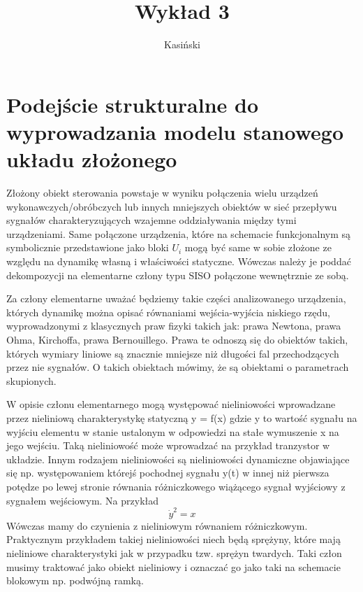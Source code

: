 \documentclass{article}
\author{Kasiński}
\title{Wykład 3}
\begin{document}
	\maketitle
	\section{Podejście strukturalne do wyprowadzania modelu stanowego układu złożonego}

		Złożony obiekt sterowania powstaje w wyniku połączenia wielu urządzeń
		wykonawczych/obróbczych lub
		innych mniejszych obiektów  w sieć przepływu sygnałów charakteryzujących wzajemne
		oddziaływania między tymi urządzeniami.
		Same połączone urządzenia, które na schemacie funkcjonalnym są
		symbolicznie przedstawione jako bloki $U_i$ mogą być same w sobie złożone ze względu na
		dynamikę własną i właściwości statyczne. Wówczas należy je poddać dekompozycji na
		elementarne człony typu SISO połączone wewnętrznie ze sobą.
		
		Za człony elementarne uważać będziemy takie części analizowanego urządzenia, których
		dynamikę można opisać równaniami wejścia-wyjścia niskiego rzędu,
		wyprowadzonymi z klasycznych praw fizyki takich jak: prawa Newtona, prawa Ohma,
		Kirchoffa, prawa Bernouillego. Prawa te odnoszą się do obiektów
		takich, których wymiary liniowe są znacznie mniejsze niż długości fal
		przechodzących przez nie sygnałów. O takich obiektach mówimy, że są obiektami
		o parametrach skupionych.

		W opisie członu elementarnego mogą występować nieliniowości wprowadzane przez
		nieliniową charakterystykę statyczną y = f(x) gdzie y to wartość sygnału na
		wyjściu elementu w stanie ustalonym w odpowiedzi na stałe wymuszenie
		x na jego wejściu.
		Taką nieliniowość może wprowadzać na przykład tranzystor w układzie.
		Innym rodzajem nieliniowości są nieliniowości dynamiczne objawiające się np. występowaniem
		którejś pochodnej sygnału y(t) w innej niż pierwsza potędze po lewej stronie równania
		różniczkowego wiążącego sygnał wyjściowy z sygnałem wejściowym.
		Na przykład
		\begin{equation}
			\dot{y}^2 = x 
		\end{equation}
		Wówczas mamy do
		czynienia z nieliniowym równaniem różniczkowym.
		Praktycznym przykładem takiej nieliniowości niech będą
		sprężyny, które mają nieliniowe charakterystyki jak w przypadku tzw. sprężyn twardych.
		Taki człon musimy traktować jako
		obiekt nieliniowy i oznaczać go jako taki na schemacie blokowym np. podwójną ramką.
\end{document}
